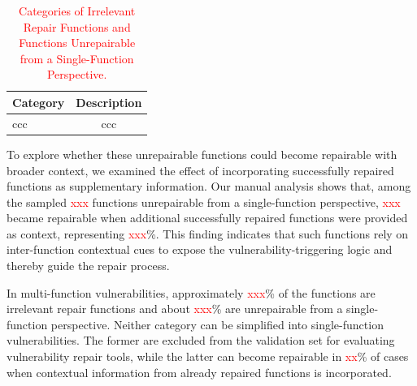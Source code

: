 \begin{table}[h]
\centering
\begin{tabular}{l|c}
\hline
\textbf{Category} & \textbf{Description} \\
\hline
ccc & ccc \\
\hline
\end{tabular}
\caption{\textcolor{red}{Categories of Irrelevant Repair Functions and Functions Unrepairable from a Single-Function Perspective.}}
\label{tab:irf-ur-categories}
\end{table}

To explore whether these unrepairable functions could become repairable with broader context, we examined the effect of incorporating successfully repaired functions as supplementary information. Our manual analysis shows that, among the sampled \textcolor{red}{xxx} functions unrepairable from a single-function perspective, \textcolor{red}{xxx} became repairable when additional successfully repaired functions were provided as context, representing \textcolor{red}{xxx}\%. This finding indicates that such functions rely on inter-function contextual cues to expose the vulnerability-triggering logic and thereby guide the repair process.
          


\begin{tcolorbox}[colback=gray!5!white, colframe=black!75, title=Answer to RQ1]

In multi-function vulnerabilities, approximately \textcolor{red}{xxx}\% of the functions are irrelevant repair functions and about \textcolor{red}{xxx}\% are unrepairable from a single-function perspective. Neither category can be simplified into single-function vulnerabilities. The former are excluded from the validation set for evaluating vulnerability repair tools, while the latter can become repairable in \textcolor{red}{xx}\% of cases when contextual information from already repaired functions is incorporated.

\end{tcolorbox}


